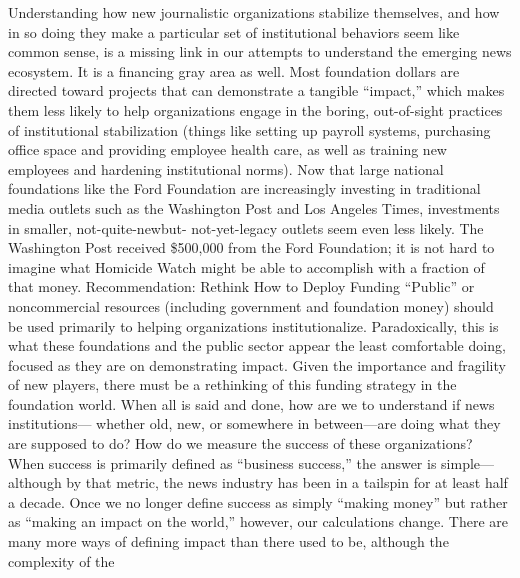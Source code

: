 Understanding how new journalistic organizations stabilize themselves, and how
in so doing they make a particular set of institutional behaviors seem like common
sense, is a missing link in our attempts to understand the emerging news
ecosystem. It is a financing gray area as well. Most foundation dollars are directed
toward projects that can demonstrate a tangible ``impact,'' which makes them
less likely to help organizations engage in the boring, out-of-sight practices of
institutional stabilization (things like setting up payroll systems, purchasing office
space and providing employee health care, as well as training new employees
and hardening institutional norms). Now that large national foundations like the
Ford Foundation are increasingly investing in traditional media outlets such as the
Washington Post and Los Angeles Times, investments in smaller, not-quite-newbut-
not-yet-legacy outlets seem even less likely. The Washington Post received
\$500,000 from the Ford Foundation; it is not hard to imagine what Homicide
Watch might be able to accomplish with a fraction of that money.
Recommendation: Rethink How to Deploy Funding
``Public'' or noncommercial resources (including government and foundation
money) should be used primarily to helping organizations institutionalize.
Paradoxically, this is what these foundations and the public
sector appear the least comfortable doing, focused as they are on demonstrating
impact. Given the importance and fragility of new players, there
must be a rethinking of this funding strategy in the foundation world.
When all is said and done, how are we to understand if news institutions—
whether old, new, or somewhere in between—are doing what they are supposed
to do? How do we measure the success of these organizations? When success is
primarily defined as ``business success,'' the answer is simple—although by that
metric, the news industry has been in a tailspin for at least half a decade. Once
we no longer define success as simply ``making money'' but rather as ``making an
impact on the world,'' however, our calculations change. There are many more
ways of defining impact than there used to be, although the complexity of the

